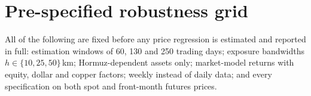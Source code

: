 \documentclass{article}
\begin{document}
\section{Pre-specified robustness grid}
\label{app:robust}

All of the following are fixed before any price regression is estimated and reported in full: estimation windows of 60, 130 and 250 trading days; exposure bandwidths $h \in \{10, 25, 50\}$\,km; Hormuz-dependent assets only; market-model returns with equity, dollar and copper factors; weekly instead of daily data; and every specification on both spot and front-month futures prices.
\end{document}
